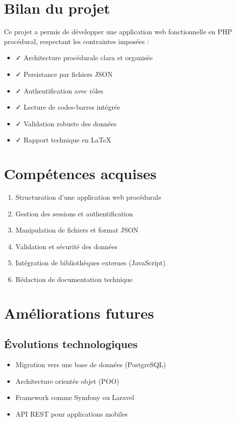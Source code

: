 \documentclass[12pt,a4paper,french]{report}
\begin{document}
\section{Bilan du projet}

Ce projet a permis de développer une application web fonctionnelle en PHP procédural, respectant les contraintes imposées :

\begin{itemize}
    \item ✓ Architecture procédurale clara et organisée
    \item ✓ Persistance par fichiers JSON
    \item ✓ Authentification avec rôles
    \item ✓ Lecture de codes-barres intégrée
    \item ✓ Validation robuste des données
    \item ✓ Rapport technique en \LaTeX{}
\end{itemize}

\section{Compétences acquises}

\begin{enumerate}
    \item Structuration d'une application web procédurale
    \item Gestion des sessions et authentification
    \item Manipulation de fichiers et format JSON
    \item Validation et sécurité des données
    \item Intégration de bibliothèques externes (JavaScript)
    \item Rédaction de documentation technique
\end{enumerate}

\section{Améliorations futures}

\subsection{Évolutions technologiques}

\begin{itemize}
    \item Migration vers une base de données (PostgreSQL)
    \item Architecture orientée objet (POO)
    \item Framework comme Symfony ou Laravel
    \item API REST pour applications mobiles
\end{itemize}
\end{document}

